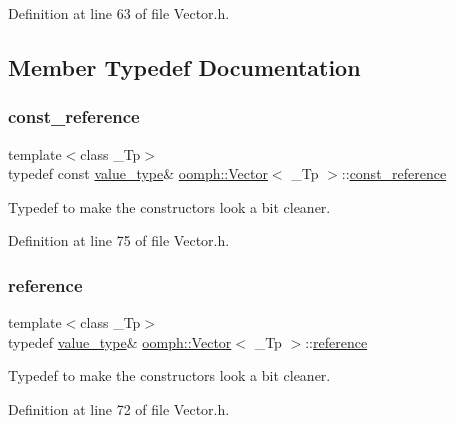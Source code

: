 Definition at line 63 of file Vector.\+h.



\subsection{Member Typedef Documentation}
\mbox{\label{classoomph_1_1Vector_ad126afbb3b115ef9dce224cf33c71428}} 
\subsubsection{\texorpdfstring{const\+\_\+reference}{const\_reference}}
{\footnotesize\ttfamily template$<$class \+\_\+\+Tp$>$ \\
typedef const \hyperlink{classoomph_1_1Vector_a73b0fda236ce64119befbeb30111f0b2}{value\+\_\+type}\& \hyperlink{classoomph_1_1Vector}{oomph\+::\+Vector}$<$ \+\_\+\+Tp $>$\+::\hyperlink{classoomph_1_1Vector_ad126afbb3b115ef9dce224cf33c71428}{const\+\_\+reference}}



Typedef to make the constructors look a bit cleaner. 



Definition at line 75 of file Vector.\+h.

\mbox{\label{classoomph_1_1Vector_a7bd8c89b884168f3ecc358acc501d356}} 
\subsubsection{\texorpdfstring{reference}{reference}}
{\footnotesize\ttfamily template$<$class \+\_\+\+Tp$>$ \\
typedef \hyperlink{classoomph_1_1Vector_a73b0fda236ce64119befbeb30111f0b2}{value\+\_\+type}\& \hyperlink{classoomph_1_1Vector}{oomph\+::\+Vector}$<$ \+\_\+\+Tp $>$\+::\hyperlink{classoomph_1_1Vector_a7bd8c89b884168f3ecc358acc501d356}{reference}}



Typedef to make the constructors look a bit cleaner. 



Definition at line 72 of file Vector.\+h.

